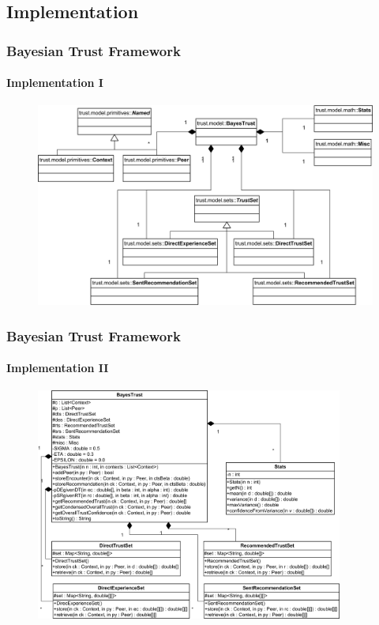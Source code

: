 \subsection{Implementation}
\begin{frame}
\frametitle{Bayesian Trust Framework}
\framesubtitle{Implementation I}

\begin{figure}[h!]
  \centering  
  \includegraphics[width=1\textwidth]{../report/images/bayestrust}
\end{figure}

\end{frame}


\begin{frame}
\frametitle{Bayesian Trust Framework}
\framesubtitle{Implementation II}

\begin{figure}[h!]
  \centering  
  \includegraphics[width=0.9\textwidth]{../report/images/bayestrustdetail}
\end{figure}

\end{frame}